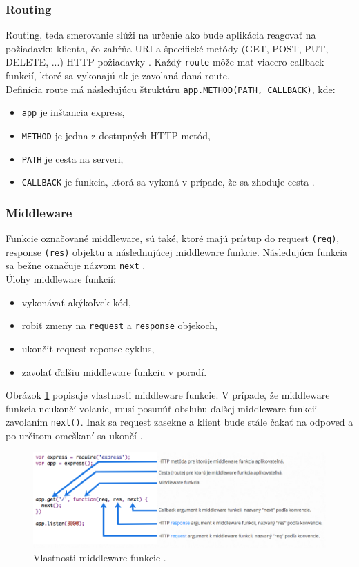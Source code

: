 \subsubsection{Routing}
Routing, teda smerovanie slúži na určenie ako bude aplikácia reagovať na požiadavku klienta, čo zahŕňa URI a špecifické metódy (GET, POST, PUT, DELETE, ...) HTTP požiadavky \cite{express-tutorial}.
Každý \verb|route| môže mať viacero callback funkcií, ktoré sa vykonajú ak je zavolaná daná route.\\

\noindent Definícia route má následujúcu štruktúru \verb|app.METHOD(PATH, CALLBACK)|, kde:
\begin{itemize}
\item \verb|app| je inštancia express,
\item \verb|METHOD| je jedna z dostupných HTTP metód,
\item \verb|PATH| je cesta na serveri,
\item \verb|CALLBACK| je funkcia, ktorá sa vykoná v prípade, že sa zhoduje cesta \cite{express-routing}.
\end{itemize}

\subsubsection{Middleware}
Funkcie označované middleware, sú také, ktoré majú prístup do request \verb|(req)|, response \verb|(res)| objektu a následnujúcej middleware funkcie. Následujúca funkcia sa bežne označuje názvom \verb|next| \cite{express-middleware}.\\

\noindent Úlohy middleware funkcií:
\begin{itemize}
\item vykonávať akýkoľvek kód,
\item robiť zmeny na \verb|request| a \verb|response| objekoch,
\item ukončiť request-reponse cyklus,
\item zavolať ďalšiu middleware funkciu v poradí. 
\end{itemize}

Obrázok \ref{img-express-middleware} popisuje vlastnosti middleware funkcie. V prípade, že middleware funkcia neukončí volanie, musí posunúť obsluhu ďalšej middleware funkcii zavolaním \verb|next()|. Inak sa request zasekne a klient bude stále čakať na odpoveď a po určitom omeškaní sa ukončí \cite{express-middleware}.

\begin{figure}[H]
  \centering
  \includegraphics[scale=0.5]{img/express/express-middleware.png}
  \caption{Vlastnosti middleware funkcie \cite{express-middleware}.}
  \label{img-express-middleware}
\end{figure}

